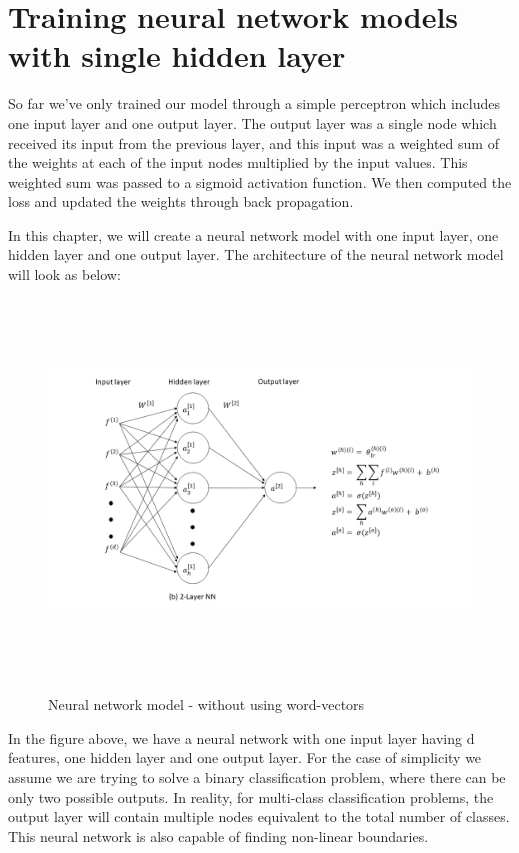 \newpage
\chapter{Training neural network models with single hidden layer}

So far we've only trained our model through a simple perceptron which includes one input layer and one output layer. The output layer was a single node which received its input from the previous layer, and this input was a weighted sum of the weights at each of the input nodes multiplied by the input values. This weighted sum was passed to a sigmoid activation function. We then computed the loss and updated the weights through back propagation.

In this chapter, we will create a neural network model with one input layer, one hidden layer and one output layer. The architecture of the neural network model will look as below:

\begin{figure}[htbp]
\centering
\includegraphics[width=16cm, height=10cm]{images/nn1.png}\\
\centering
\caption{Neural network model - without using word-vectors}
\label{fig:foo}
\end{figure}

In the figure above, we have a neural network with one input layer having d features, one hidden layer and one output layer. For the case of simplicity we assume we are trying to solve a binary classification problem, where there can be only two possible outputs. In reality, for multi-class classification problems, the output layer will contain multiple nodes equivalent to the total number of classes. This neural network is also capable of finding non-linear boundaries.


